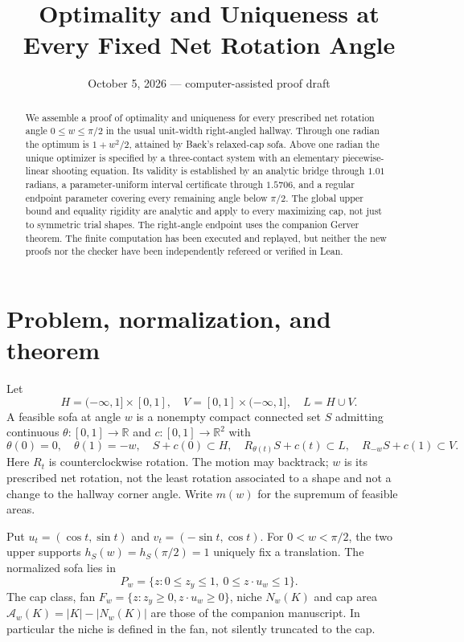 \documentclass[11pt]{article}
\title{Optimality and Uniqueness at Every Fixed Net Rotation Angle}
\author{}\date{October 5, 2026 --- computer-assisted proof draft}
\theoremstyle{remark}\newtheorem{remark}[theorem]{Remark}
\newcommand{\R}{\mathbb R}
\begin{document}
\maketitle
\begin{abstract}
We assemble a proof of optimality and uniqueness for every prescribed net rotation angle $0\le w\le\pi/2$ in the usual unit-width right-angled hallway. Through one radian the optimum is $1+w^2/2$, attained by Baek's relaxed-cap sofa. Above one radian the unique optimizer is specified by a three-contact system with an elementary piecewise-linear shooting equation. Its validity is established by an analytic bridge through $1.01$ radians, a parameter-uniform interval certificate through $1.5706$, and a regular endpoint parameter covering every remaining angle below $\pi/2$. The global upper bound and equality rigidity are analytic and apply to every maximizing cap, not just to symmetric trial shapes. The right-angle endpoint uses the companion Gerver theorem. The finite computation has been executed and replayed, but neither the new proofs nor the checker have been independently refereed or verified in Lean.
\end{abstract}

\section{Problem, normalization, and theorem}
Let
\[
 H=(-\infty,1]\times[0,1],\quad V=[0,1]\times(-\infty,1],\quad L=H\cup V.
\]
A feasible sofa at angle $w$ is a nonempty compact connected set $S$ admitting continuous $\theta:[0,1]\to\R$ and $c:[0,1]\to\R^2$ with
\[
 \theta(0)=0,\quad\theta(1)=-w,\quad
 S+c(0)\subset H,\quad R_{\theta(t)}S+c(t)\subset L,\quad
 R_{-w}S+c(1)\subset V.
\]
Here $R_t$ is counterclockwise rotation. The motion may backtrack; $w$ is its prescribed net rotation, not the least rotation associated to a shape and not a change to the hallway corner angle. Write $m(w)$ for the supremum of feasible areas.

Put $u_t=(\cos t,\sin t)$ and $v_t=(-\sin t,\cos t)$. For $0<w<\pi/2$, the two upper supports $h_S(w)=h_S(\pi/2)=1$ uniquely fix a translation. The normalized sofa lies in
\[
 P_w=\{z:0\le z_y\le1,\ 0\le z\cdot u_w\le1\}.
\]
The cap class, fan $F_w=\{z:z_y\ge0,z\cdot u_w\ge0\}$, niche $N_w(K)$ and cap area $\mathcal A_w(K)=|K|-|N_w(K)|$ are those of the companion manuscript. In particular the niche is defined in the fan, not silently truncated to the cap.
\end{document}

